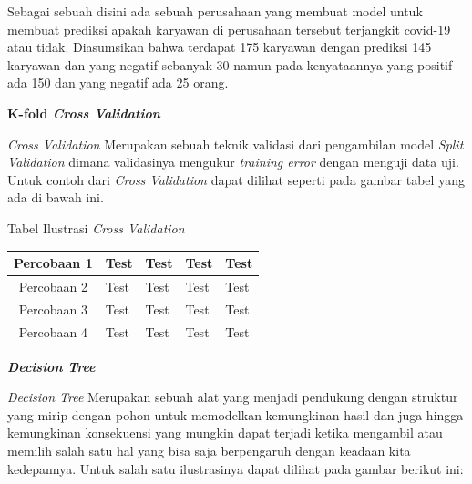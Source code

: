 \documentclass{report}
\begin{document}
\hangindent=0.5cm Sebagai sebuah disini ada sebuah perusahaan yang membuat model untuk membuat prediksi apakah karyawan di perusahaan tersebut terjangkit covid-19 atau tidak. Diasumsikan bahwa terdapat 175 karyawan dengan prediksi 145 karyawan dan yang negatif sebanyak 30 namun pada kenyataannya yang positif ada 150 dan yang negatif ada 25 orang.

\vspace{0.5cm}

{\bf K-fold \emph{Cross Validation}}
\vspace{0.1cm}

\hangindent=0.5cm \emph{Cross Validation} Merupakan sebuah teknik validasi dari pengambilan model \emph{Split Validation} dimana validasinya mengukur \emph{training error} dengan menguji data uji. Untuk contoh dari \emph{Cross Validation} dapat dilihat seperti pada gambar tabel yang ada di bawah ini.

\vspace{0.4cm}
\begin{center}
Tabel Ilustrasi \emph{Cross Validation}
\begin{table}[h!]
\centering
\begin{tabular}{|c|l|l|l|l|} %
\hline %
Percobaan 1&\cellcolor{orange!50} Test  &  Test & Test & Test \\
\hline %
Percobaan 2& Test & \cellcolor{orange!50}Test & Test & Test\\
\hline 
Percobaan 3&Test & Test &\cellcolor{orange!50} Test & Test \\
\hline 
Percobaan 4&Test & Test & Test &\cellcolor{orange!50} Test \\
\hline %
\end{tabular}
\end{table}
\end{center}

\vspace{0.5cm}

{\bf \emph{Decision Tree}}
\vspace{0.1cm}

\hangindent=0.5cm \emph{Decision Tree} Merupakan sebuah alat yang menjadi pendukung dengan struktur yang mirip dengan pohon untuk memodelkan kemungkinan hasil dan juga hingga kemungkinan konsekuensi yang mungkin dapat terjadi ketika mengambil atau memilih salah satu hal yang bisa saja berpengaruh dengan keadaan kita kedepannya. Untuk salah satu ilustrasinya dapat dilihat pada gambar berikut ini:
\end{document}

